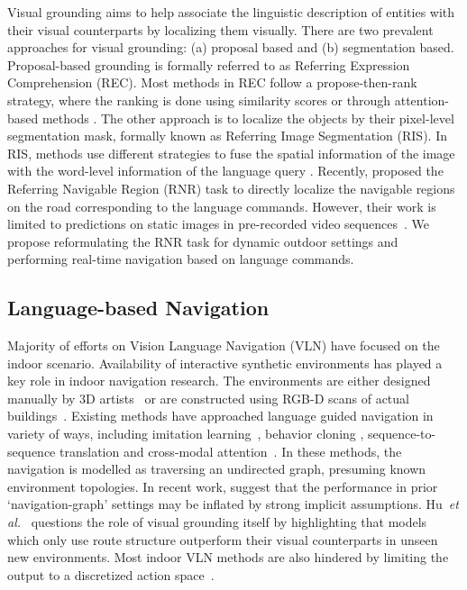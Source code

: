 \documentclass[letterpaper, 10 pt, conference]{ieeeconf}  %
\newcommand{\etal}{\textit{et al.}}
\begin{document}
Visual grounding aims to help associate the linguistic description of entities with their visual counterparts by localizing them visually. There are two prevalent approaches for visual grounding: (a) proposal based and (b) segmentation based. Proposal-based grounding is formally referred to as Referring Expression Comprehension (REC). Most methods in REC follow a propose-then-rank strategy, where the ranking is done using similarity scores \cite{rohrbach2016grounding,hu2016natural,plummer2018conditional,rufus2020cosine} or through attention-based methods \cite{deng2018visual,zhang2018grounding,yang2019dynamic,qiu2020language}. The other approach is to localize the objects by their pixel-level segmentation mask, formally known as Referring Image Segmentation (RIS). In RIS, methods use different strategies to fuse the spatial information of the image with the word-level information of the language query \cite{shi2018key,ye2019cross,huang2020referring,jain2021comprehensive}. Recently, \cite{Rufus_2021} proposed the Referring Navigable Region (RNR) task to directly localize the navigable regions on the road corresponding to the language commands. However, their work is limited to predictions on static images in pre-recorded video sequences~\cite{caesar2020nuscenes}. We propose reformulating the RNR task for dynamic outdoor settings and performing real-time navigation based on language commands.

\subsection{Language-based Navigation}
Majority of efforts on Vision Language Navigation (VLN) have focused on the indoor scenario. Availability of interactive synthetic environments has played a key role in indoor navigation research. The environments are either designed manually by 3D artists~\cite{kolve2017ai2,wu2018building} or are constructed using RGB-D scans of actual buildings~\cite{chang2017matterport3d}. Existing methods have approached language guided navigation in variety of ways, including imitation learning~\cite{nguyen2019vision,nguyen2019help}, behavior cloning \cite{das2018neural}, sequence-to-sequence translation \cite{anderson2018vision} and cross-modal attention~\cite{cornia2019perceive}. In these methods, the navigation is modelled as traversing an undirected graph, presuming known environment topologies. In recent work, \cite{krantz2020beyond} suggest that the performance in prior `navigation-graph' settings may be inflated by strong implicit assumptions. Hu~\etal~\cite{hu2019you} questions the role of visual grounding itself by highlighting that models which only use route structure outperform their visual counterparts in unseen new environments. Most indoor VLN methods are also hindered by limiting the output to a discretized action space~\cite{irshad2021hierarchical}.
\end{document}
